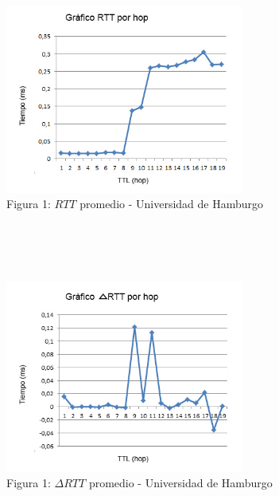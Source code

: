 \begin{figure}[h]
	\begin{center}
    \includegraphics[width=0.7\textwidth]{img_analisis3/grafico-rtt-promedio.jpg} 
    \caption{Figura 1: $RTT$ promedio - Universidad de Hamburgo}	
	\end{center} 
\end{figure}
\newpage
\\
\\
\\


\begin{figure}[h]
	\begin{center}
    \includegraphics[width=0.7\textwidth]{img_analisis3/grafico-delta-rtt-promedio.jpg} 
    \caption{Figura 1: $\Delta RTT$ promedio - Universidad de Hamburgo}	
	\end{center} 
\end{figure}
\newpage

